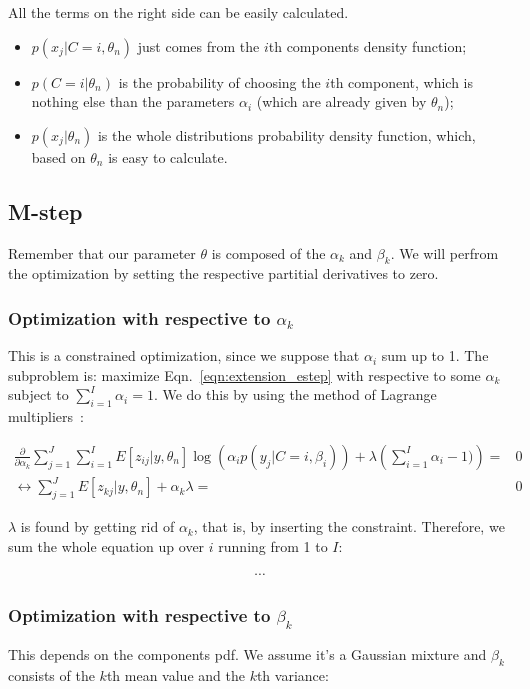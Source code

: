 \documentclass{article}  %
\begin{document}
All the terms on the right side can be easily calculated. 
\begin{itemize}
  \item $p(x_j|C=i,\theta_n)$ just comes from the $i$th components density
  function;
  \item $p(C=i|\theta_n)$ is the probability of choosing the $i$th component,
  which is nothing else than the parameters $\alpha_i$ (which are already given
  by $\theta_n$);
  \item $p(x_j|\theta_n)$ is the whole distributions probability density
  function, which, based on $\theta_n$ is easy to calculate.
\end{itemize}

\subsection{M-step}

Remember that our parameter $\theta$ is composed of the $\alpha_k$ and
$\beta_k$. We will perfrom the optimization by setting the respective partitial
derivatives to zero.

\subsubsection{Optimization with respective to $\alpha_k$}

This is a constrained optimization, since we suppose that $\alpha_i$ sum up to
1. The subproblem is: maximize Eqn.~\ref{eqn:extension_estep} with respective to
some $\alpha_k$ subject to $\sum_{i=1}^I \alpha_i=1$. We do this by using the
method of Lagrange multipliers~\cite{lagrange}:

\begin{align}
\frac{\partial}{\partial\alpha_k}\sum_{j=1}^J\sum_{i=1}^I
E[z_{ij}|y,\theta_n]\log(\alpha_i p(y_j|C=i,\beta_i)) + \lambda
\left(\sum_{i=1}^I \alpha_i-1)\right) = &0\\
\leftrightarrow \sum_{j=1}^J E \left[z_{kj}|y,\theta_n\right] + \alpha_k
\lambda= &0 
\end{align}

$\lambda$ is found by getting rid of $\alpha_k$, that is, by inserting the
constraint. Therefore, we sum the whole equation up over $i$ running from 1 to
$I$:

\begin{align}
\cdots
\end{align}

\subsubsection{Optimization with respective to $\beta_k$}
This depends on the components pdf. We assume it's a Gaussian mixture and
$\beta_k$ consists of the $k$th mean value and the $k$th variance:
\end{document}
